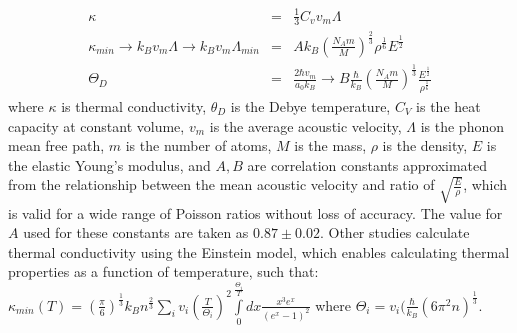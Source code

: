 \begin{eqnarray}
    \kappa &=& \frac{1}{3} C_v v_m \Lambda \\ \label{eqn:kappa-debye}
    \kappa_{min} \rightarrow k_B v_m \Lambda \rightarrow k_B v_m \Lambda_{min} &=& A k_B (\frac{N_A m}{M})^{\frac{2}{3}} \rho^{\frac{1}{6}} E^{\frac{1}{2}} \label{eqn:kappa-min-debye} \\
    \Theta_D &=& \frac{2\hbar v_m}{a_0 k_B} \rightarrow B \frac{\hbar}{k_B} (\frac{N_A m}{M})^{\frac{1}{3}} \frac{E^{\frac{1}{2}} }{\rho^{\frac{1}{6}}} \label{eqn:debye-temp-debye}
\end{eqnarray}
where $\kappa$ is thermal conductivity, $\theta_D$ is the Debye temperature, $C_V$ is the heat capacity at constant volume, $v_m$ is the average acoustic velocity, $\Lambda$ is the phonon mean free path, $m$ is the number of atoms, $M$ is the mass, $\rho$ is the density, $E$ is the elastic Young's modulus, and $A, B$ are correlation constants approximated from the relationship between the mean acoustic velocity and ratio of $\sqrt{\frac{E}{\rho}}$, which is valid for a wide range of Poisson ratios without loss of accuracy. The value for $A$ used for these constants are taken as $0.87 \pm 0.02$. Other studies calculate thermal conductivity using the Einstein model, which enables calculating thermal properties as a function of temperature, such that: $\kappa_{min} (T) = (\frac{\pi}{6})^{\frac{1}{3}} k_B n^{\frac{2}{3}} \sum\limits_{i} v_i (\frac{T}{\Theta_i})^2 \int\limits_{0}^{\frac{\Theta_i}{T}} dx \frac{x^3 e^x}{(e^x -1)^2}$ where $\Theta_i = v_i (\frac{\hbar}{k_B} (6\pi^2n)^{\frac{1}{3}} $. \cite{cahill1992lower}





